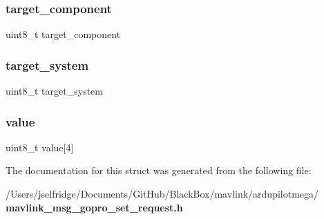 \subsubsection{target\+\_\+component}
{\footnotesize\ttfamily uint8\+\_\+t target\+\_\+component}

\mbox{\label{struct____mavlink__gopro__set__request__t_ac9afff43526a157e4c4e45607c1418b8}} 
\subsubsection{target\+\_\+system}
{\footnotesize\ttfamily uint8\+\_\+t target\+\_\+system}

\mbox{\label{struct____mavlink__gopro__set__request__t_ab6205fee79f7e2b59ea91c21e6152b94}} 
\subsubsection{value}
{\footnotesize\ttfamily uint8\+\_\+t value[4]}



The documentation for this struct was generated from the following file\+:\begin{DoxyCompactItemize}
\item 
/\+Users/jselfridge/\+Documents/\+Git\+Hub/\+Black\+Box/mavlink/ardupilotmega/\textbf{ mavlink\+\_\+msg\+\_\+gopro\+\_\+set\+\_\+request.\+h}\end{DoxyCompactItemize}
